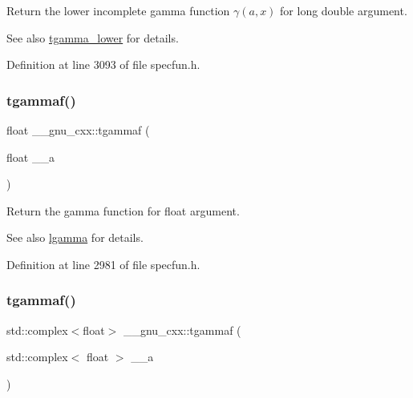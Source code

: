 Return the lower incomplete gamma function $ \gamma(a,x) $ for {\ttfamily long double} argument.

\begin{DoxySeeAlso}{See also}
\hyperlink{group__gnu__math__spec__func_gaed107908dec8865ea48e7764f7ea88a2}{tgamma\+\_\+lower} for details. 
\end{DoxySeeAlso}


Definition at line 3093 of file specfun.\+h.

\mbox{\label{group__gnu__math__spec__func_ga008b1f4cc3a54c9c8221ad1f3504b593}} 
\subsubsection{\texorpdfstring{tgammaf()}{tgammaf()}\hspace{0.1cm}{\footnotesize\ttfamily [1/3]}}
{\footnotesize\ttfamily float \+\_\+\+\_\+gnu\+\_\+cxx\+::tgammaf (\begin{DoxyParamCaption}\item[{float}]{\+\_\+\+\_\+a }\end{DoxyParamCaption})\hspace{0.3cm}{\ttfamily [inline]}}

Return the gamma function for {\ttfamily  float } argument.

\begin{DoxySeeAlso}{See also}
\hyperlink{group__gnu__math__spec__func_ga40fa5127f7c419ed1d8f1c6a6f96ea9b}{lgamma} for details. 
\end{DoxySeeAlso}


Definition at line 2981 of file specfun.\+h.

\mbox{\label{group__gnu__math__spec__func_gaf548b80db1501cbc067de1564e721972}} 
\subsubsection{\texorpdfstring{tgammaf()}{tgammaf()}\hspace{0.1cm}{\footnotesize\ttfamily [2/3]}}
{\footnotesize\ttfamily std\+::complex$<$float$>$ \+\_\+\+\_\+gnu\+\_\+cxx\+::tgammaf (\begin{DoxyParamCaption}\item[{std\+::complex$<$ float $>$}]{\+\_\+\+\_\+a }\end{DoxyParamCaption})\hspace{0.3cm}{\ttfamily [inline]}}

